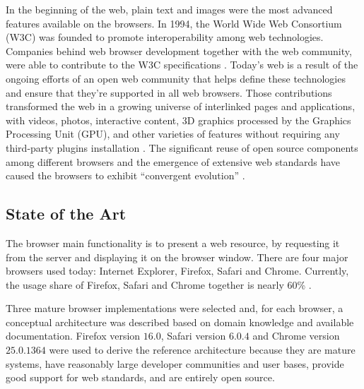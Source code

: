 In the beginning of the web, plain text and images were the most advanced features available on the browsers. In 1994, the World Wide Web Consortium (W3C) was founded to promote interoperability among web technologies. Companies behind web browser development together with the web community, were able to contribute to the W3C specifications \cite{WC2006}. Today's web is a result of the ongoing efforts of an open web community that helps define these technologies and ensure that they're supported in all web browsers. Those contributions transformed the web in a growing universe of interlinked pages and applications, with videos, photos, interactive content, 3D graphics processed by the Graphics Processing Unit (GPU), and other varieties of features without requiring any third-party plugins installation \cite{Hickson2013}. The significant reuse of open source components among different browsers and the emergence of extensive web standards have caused the browsers to exhibit ``convergent evolution'' \cite{Grosskurth2005}.

\subsection{State of the Art} %
\label{sub:basic_concepts:web:state_of_the_art}

The browser main functionality is to present a web resource, by requesting it from the server and displaying it on the browser window. There are four major browsers used today: Internet Explorer, Firefox, Safari and Chrome. Currently, the usage share of Firefox, Safari and Chrome together is nearly 60\% \cite{Traffic2013}.

Three mature browser implementations were selected and, for each browser, a conceptual architecture was described based on domain knowledge and available documentation. Firefox version $16.0$, Safari version $6.0.4$ and Chrome version $25.0.1364$ were used to derive the reference architecture because they are mature systems, have reasonably large developer communities and user bases, provide good support for web standards, and are entirely open source.

